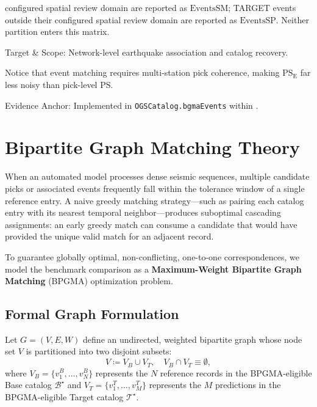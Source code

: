 \begin{landscape}
\begin{table}[htbp]
\begin{threeparttable}
\begin{tablenotes}[flushleft]
        configured spatial review domain are reported as
        $\mathrm{EventsSM}$; TARGET events outside their configured
        spatial review domain are reported as $\mathrm{EventsSP}$.
        Neither partition enters this matrix.
      \item Target \& Scope: Network-level earthquake association and
        catalog recovery.
      \item Notice that event matching requires multi-station pick
        coherence, making $\mathrm{PS}_{\mathrm{E}}$ far less noisy
        than pick-level $\mathrm{PS}$.
      \item Evidence Anchor: Implemented in
        \texttt{OGSCatalog.bgmaEvents} within .
      \end{tablenotes}
    \end{threeparttable}
  \end{table}
\end{landscape}

\section{Bipartite Graph Matching Theory}
\label{sec:bipartite_matching}

When an automated model processes dense seismic sequences, multiple
candidate picks or associated events frequently fall within the
tolerance window of a single reference entry. A naive greedy
matching strategy---such as pairing each catalog entry with its
nearest temporal neighbor---produces suboptimal cascading
assignments: an early greedy match can consume a candidate that
would have provided the unique valid match for an adjacent record.

To guarantee globally optimal, non-conflicting, one-to-one
correspondences, we model the benchmark comparison as a
\textbf{Maximum-Weight Bipartite Graph Matching} (\ac{BPGMA})
optimization problem.

\subsection{Formal Graph Formulation}
Let $G = (V, E, W)$ define an undirected, weighted bipartite graph
whose node set $V$ is partitioned into two disjoint subsets:
\begin{equation}
  V \coloneqq V_B \cup V_T, \quad V_B \cap V_T \equiv \emptyset,
\end{equation}
where $V_B = \{v_1^B, \dots, v_N^B\}$ represents the $N$ reference
records in the \acs{BPGMA}-eligible Base catalog $\mathcal{B}^{\star}$ and
$V_T = \{v_1^T, \dots, v_M^T\}$ represents the $M$ predictions in the
\acs{BPGMA}-eligible Target catalog $\mathcal{T}^{\star}$.

